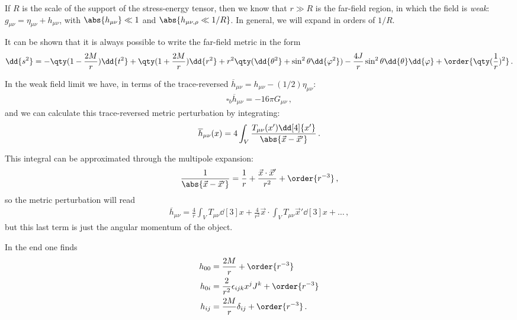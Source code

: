 \documentclass[main.tex]{subfiles}
\begin{document}
If \(R\) is the scale of the support of the stress-energy tensor, then we know that \(r \gg R\) is the far-field region, in which the field is \emph{weak}: \(g_{\mu \nu } = \eta_{\mu \nu } + h_{\mu \nu }\), with \(\abs{h_{\mu \nu }} \ll 1 \) and \(\abs{h_{\mu \nu , \rho } \ll 1/R}\).
In general, we will expand in orders of \(1/R\). 

It can be shown that it is always possible to write the far-field metric in the form 
%
\begin{align}
\dd{s^2} = - \qty(1 - \frac{2M}{r}) \dd{t^2}
+ \qty(1 + \frac{2M}{r}) \dd{r^2} + r^2 \qty( \dd{\theta^2} + \sin^2 \theta \dd{\varphi^2}) - \frac{4 J }{r} \sin^2 \theta \dd{\theta } \dd{\varphi } + \order{ \qty( \frac{1}{r})^2}
\,.
\end{align}

In the weak field limit we have, in terms of the trace-reversed \(\overline{h}_{\mu \nu } = h_{\mu \nu } - (1/2) \eta_{\mu \nu }\):
%
\begin{align}
\square_b \overline{h}_{\mu \nu } = - 16 \pi G_{\mu \nu }
\,,
\end{align}
%
and we can calculate this trace-reversed metric perturbation by integrating:
%
\begin{align}
\overline{h}_{\mu \nu } (x) = 4 \int_{V} \frac{T_{\mu \nu } (x') \dd[4]{x'}}{\abs{\vec{x} - \vec{x}'}}
\,.
\end{align}

This integral can be approximated through the multipole expansion: 
%
\begin{align}
\frac{1}{\abs{\vec{x} - \vec{x}'}} = \frac{1}{r} + \frac{\vec{x} \cdot \vec{x}^{\prime}}{r^2} + \order{r^{-3}}
\,,
\end{align}
%
so the metric perturbation will read 
%
\begin{align}
\overline{h}_{\mu \nu } = \frac{4}{r} \int_{V} T_{\mu \nu } \dd[3]{x} 
+ \frac{4}{r^2} \vec{x} \cdot
\int_{V} T_{\mu \nu } \vec{x}' \dd[3]{x} 
+ \dots
\,,
\end{align}
%
but this last term is just the angular momentum of the object.

In the end one finds 
%
\begin{align}
h_{00} &= \frac{2M}{r} + \order{r^{-3}}  \\
h_{0i} &= \frac{2}{r^2} \epsilon_{ijk} x^{j} J^{k} + \order{r^{-3}}  \\
h_{ij} &= \frac{2M}{r} \delta_{ij} + \order{r^{-3}}
\,.
\end{align}
\end{document}
